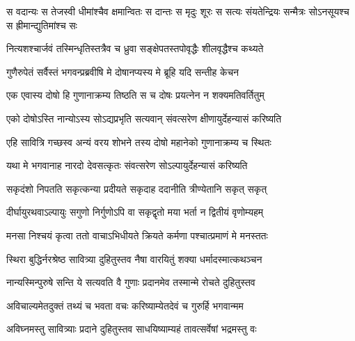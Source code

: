 \begin{center}
\threelineshloka
{स वदान्यः स तेजस्वी धीमांश्चैव क्षमान्वितः}
{स दान्तः स मृदुः शूरः स सत्यः संयतेन्द्रियः}
{सन्मैत्रः सोऽनसूयश्च स ह्रीमान्द्युतिमांश्च सः}


\twolineshloka
{नित्यशश्चार्जवं तस्मिन्धृतिस्तत्रैव च ध्रुवा}
{सङ्क्षेपतस्तपोवृद्धैः शीलवृद्धैश्च कथ्यते}




\twolineshloka
{गुणैरुपेतं सर्वैस्तं भगवन्प्रब्रवीषि मे}
{दोषानप्यस्य मे ब्रूहि यदि सन्तीह केचन}




\twolineshloka
{एक एवास्य दोषो हि गुणानाक्रम्य तिष्ठति}
{स च दोषः प्रयत्नेन न शक्यमतिवर्तितुम्}


\twolineshloka
{एको दोषोऽस्ति नान्योऽस्य सोऽद्यप्रभृति सत्यवान्}
{संवत्सरेण क्षीणायुर्देहन्यासं करिष्यति}




\twolineshloka
{एहि सावित्रि गच्छस्व अन्यं वरय शोभने}
{तस्य दोषो महानेको गुणानाक्रम्य च स्थितः}


\twolineshloka
{यथा मे भगवानाह नारदो देवसत्कृतः}
{संवत्सरेण सोऽल्पायुर्देहन्यासं करिष्यति}




\twolineshloka
{सकृदंशो निपतति सकृत्कन्या प्रदीयते}
{सकृदाह ददानीति त्रीण्येतानि सकृत् सकृत्}


\twolineshloka
{दीर्घायुरथवाऽल्पायुः सगुणो निर्गुणोऽपि वा}
{सकृद्वृतो मया भर्ता न द्वितीयं वृणोम्यहम्}


\twolineshloka
{मनसा निश्चयं कृत्वा ततो वाचाऽभिधीयते}
{क्रियते कर्मणा पश्चात्प्रमाणं मे मनस्ततः}




\twolineshloka
{स्थिरा बुद्धिर्नरश्रेष्ठ सावित्र्या दुहितुस्तव}
{नैषा वारयितुं शक्या धर्मादस्मात्कथञ्चन}


\twolineshloka
{नान्यस्मिन्पुरुषे सन्ति ये सत्यवति वै गुणाः}
{प्रदानमेव तस्मान्मे रोचते दुहितुस्तव}




\twolineshloka
{अविचाल्यमेतदुक्तं तथ्यं च भवता वचः}
{करिष्याम्येतदेवं च गुरुर्हि भगवान्मम}




\twolineshloka
{अविघ्नमस्तु सावित्र्याः प्रदाने दुहितुस्तव}
{साधयिष्याम्यहं तावत्सर्वेषां भद्रमस्तु वः}


\end{center}
